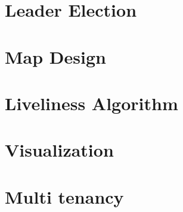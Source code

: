 \section{Leader Election}


\section{Map Design}
\label{sec:03_06_Map_Design}


\section{Liveliness Algorithm}


\section{Visualization}
\label{sec:0308}


\section{Multi tenancy}
